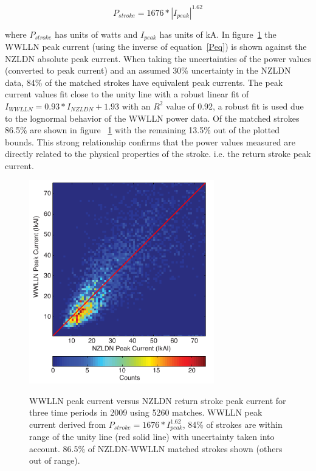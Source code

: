 \begin{equation}
P_{stroke} = 1676 * |I_{peak}|^{1.62}
\label{Peq}
\end{equation}

where $P_{stroke}$ has units of watts and $I_{peak}$ has units of kA.
In figure~\ref{pvi} the WWLLN peak current (using the inverse of equation~\ref{Peq}) is shown against the NZLDN absolute peak current.
When taking the uncertainties of the power values (converted to peak current) and an assumed 30\% uncertainty in the NZLDN data, 84\% of the matched strokes have equivalent peak currents.
The peak current values fit close to the unity line with a robust linear fit of $I_{WWLLN}=0.93*I_{NZLDN}+1.93$ with an $R^2$ value of 0.92, a robust fit is used due to the lognormal behavior of the WWLLN power data.
Of the matched strokes 86.5\% are shown in figure~ \ref{pvi} with the remaining 13.5\% out of the plotted bounds.
This strong relationship confirms that the power values measured are directly related to the physical properties of the stroke. i.e. the return stroke peak current.

 \begin{figure}[t]
 \noindent\includegraphics[width=19pc,angle=0]{energy/Figures/PPS_PvI_Error.pdf}\\
 \caption{WWLLN peak current versus NZLDN return stroke peak current for three time periods in 2009 using 5260 matches. WWLLN peak current derived from $P_{stroke} = 1676 * I_{peak}^{1.62}$, 84\% of strokes are within range of the unity line (red solid line) with uncertainty taken into account. 86.5\% of NZLDN-WWLLN matched strokes shown (others out of range).}
 \label{pvi}
 \end{figure}

